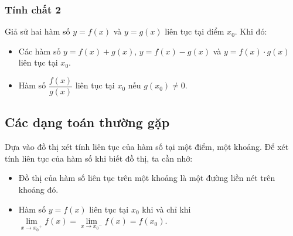 \begin{tomtat}
	\subsubsection{Tính chất 2}
	Giả sử hai hàm số $y=f(x)$ và $y=g(x)$ liên tục tại điểm $x_0$. Khi đó:
	\begin{itemize}
		\item Các hàm số $y=f(x)+g(x)$, $y=f(x)-g(x)$ và $y=f(x)\cdot g(x)$ liên tục tại $x_0$.
		\item Hàm số $\dfrac{f(x)}{g(x)}$ liên tục tại $x_0$ nếu $g(x_0)\ne 0$.
	\end{itemize}
\end{tomtat}
\subsection{Các dạng toán thường gặp}
\begin{dang}{Dựa vào đồ thị xét tính liên tục của hàm số tại một điểm, một khoảng.}
		Để xét tính liên tục của hàm số khi biết đồ thị, ta cần nhớ:
	\begin{itemize}
		\item Đồ thị của hàm số liên tục trên một khoảng là một đường liền nét trên khoảng đó.
		\item Hàm số $y=f(x)$ liên tục tại $x_0$ khi và chỉ khi $\lim\limits_{x\to{x_0}^+}f(x)=\lim\limits_{x\to{x_0}^-}f(x)=f(x_0)$.
	\end{itemize}
\end{dang}
